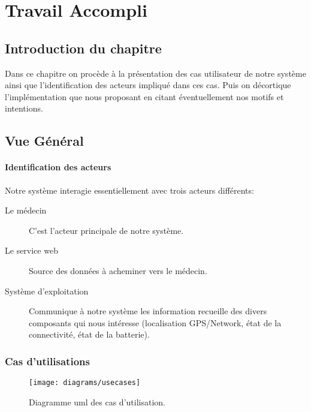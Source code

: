 
\chapter{Travail Accompli}

\section{Introduction du chapitre}

Dans ce chapitre on procède à la présentation des cas utilisateur de
notre système ainsi que l'identification des acteurs impliqué dans ces
cas. Puis on décortique l’implémentation que nous proposant en citant
éventuellement nos motifs et intentions.

\section{Vue Général}
\subsubsection{Identification des acteurs}

Notre système interagie essentiellement avec trois acteurs différents:

\begin{description}
\item[Le médecin] C'est l'acteur principale de notre système.

\item[Le service web] Source des données à acheminer vers le médecin.

\item[Système d'exploitation] Communique à notre système les information
recueille des divers composants qui nous intéresse (localisation
GPS/Network, état de la connectivité, état de la batterie).

\end{description}

\subsection{Cas d'utilisations}

\begin{figure}
\center
\texttt{[image: diagrams/usecases]}
\caption{Diagramme \gls{uml} des cas d'utilisation.}
\label{fig:usecase}
\end{figure}

